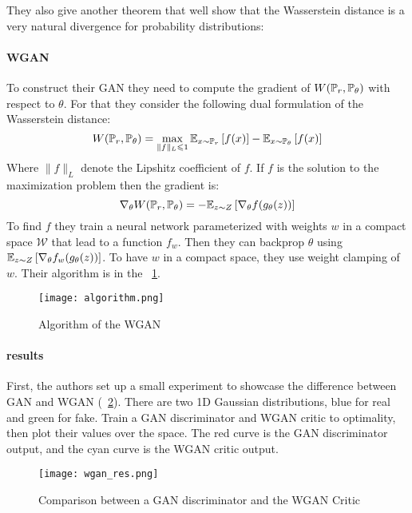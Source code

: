 They also give another theorem that well show that the Wasserstein distance is a very natural divergence for probability distributions:


\paragraph{WGAN}
To construct their GAN they need to compute the gradient of $W(\mathbb{P}_r, \mathbb{P}_\theta)$ with respect to $\theta$. For that they consider the following dual formulation of the Wasserstein distance:
$$ W(\mathbb{P}_r ,\mathbb{P}_\theta) = \max_{\| f \|_L \leqslant 1} \mathbb{E}_{x \sim \mathbb{P}_r} \left[ f(x) \right] - \mathbb{E}_{x \sim \mathbb{P}_\theta} \left[ f(x) \right] $$
Where $\| f \|_L$ denote the Lipshitz coefficient of $f$. If $f$ is the solution to the maximization problem then the gradient is:
$$ \nabla_\theta W(\mathbb{P}_r, \mathbb{P}_\theta) = - \mathbb{E}_{z \sim Z} \left[ \nabla_\theta f(g_\theta(z)) \right] $$
To find $f$ they train a neural network parameterized with weights $w$ in a compact space $\mathcal{W}$ that lead to a function $f_w$. Then they can backprop $\theta$ using $\mathbb{E}_{z \sim Z} \left[ \nabla_\theta f_w (g_\theta(z)) \right]$.  To have $w$ in a compact space, they use weight clamping of $w$. Their algorithm is in the \figurename~\ref{algo}.

\begin{figure}[t]
	\centering
	\texttt{[image: algorithm.png]}
	\caption{Algorithm of the WGAN}
	\label{algo}
\end{figure}

\paragraph{results}
First, the authors set up a small experiment to showcase the difference between GAN and WGAN (\figurename~\ref{compa}). There are two 1D Gaussian distributions, blue for real and green for fake. Train a GAN discriminator and WGAN critic to optimality, then plot their values over the space. The red curve is the GAN discriminator output, and the cyan curve is the WGAN critic output.

\begin{figure}[h]
	\centering
	\texttt{[image: wgan\_res.png]}
	\caption{Comparison between a GAN discriminator and the WGAN Critic}
	\label{compa}
\end{figure}

